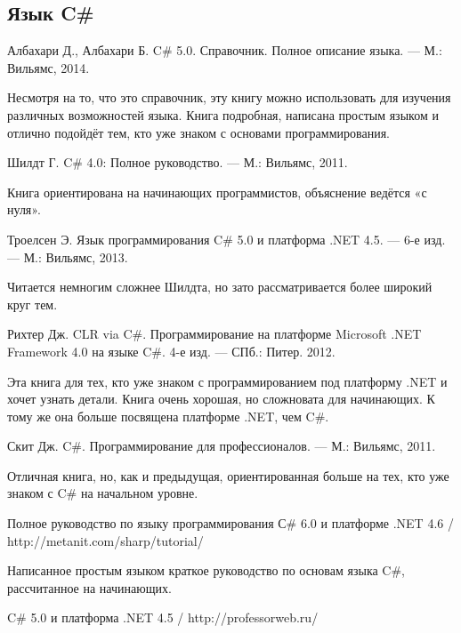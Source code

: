\begingroup
\renewcommand{\section}[2]{}%
\begin{thebibliography}{99}

  \subsection*{Язык C\#}

  Албахари Д., Албахари Б. C\# 5.0. Справочник. Полное описание языка. — М.: Вильямс, 2014.

  Несмотря на то, что это справочник, эту книгу можно использовать для
  изучения различных возможностей языка. Книга подробная, написана
  простым языком и отлично подойдёт тем, кто уже знаком с основами
  программирования.

  Шилдт Г. C\# 4.0: Полное руководство. — М.: Вильямс, 2011.

  Книга ориентирована на начинающих программистов, объяснение ведётся
  «с нуля».

  Троелсен Э. Язык программирования C\# 5.0 и платформа .NET 4.5. — 6-е изд. — М.: Вильямс, 2013.

  Читается немногим сложнее Шилдта, но зато рассматривается более
  широкий круг тем.
  
  Рихтер Дж. CLR via C\#. Программирование на платформе Microsoft .NET Framework 4.0 на языке C\#. 4-е изд. — СПб.: Питер. 2012.

  Эта книга для тех, кто уже знаком с программированием под платформу
  .NET и хочет узнать детали. Книга очень хорошая, но сложновата для
  начинающих. К тому же она больше посвящена платформе .NET, чем C\#.

  Скит Дж. C\#. Программирование для профессионалов. — М.: Вильямс, 2011.

  Отличная книга, но, как и предыдущая, ориентированная больше на тех,
  кто уже знаком с C\# на начальном уровне.

  Полное руководство по языку программирования С\# 6.0 и платформе .NET 4.6 / http://metanit.com/sharp/tutorial/

  Написанное простым языком краткое руководство по основам языка C\#,
  рассчитанное на начинающих.

  C\# 5.0 и платформа .NET 4.5 / http://professorweb.ru/


\end{thebibliography}

